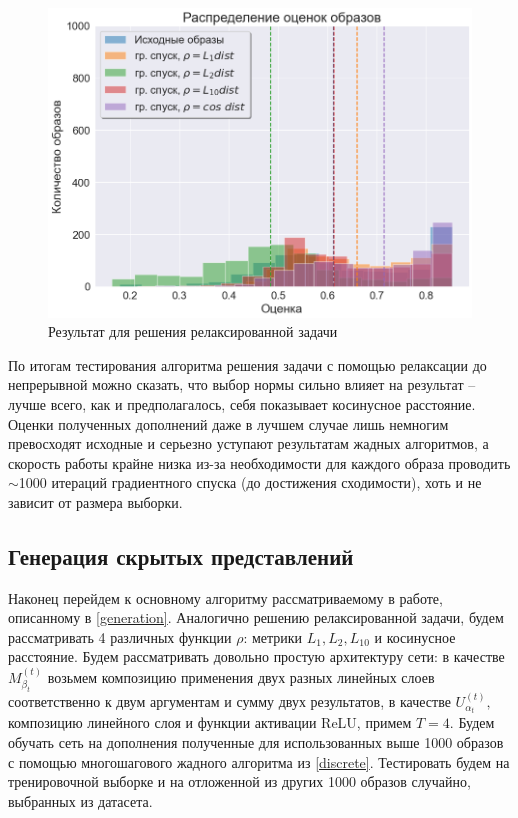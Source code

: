 \documentclass[a4paper,14pt]{extarticle}
\begin{document}
			\vspace{2cm}			
			\begin{figure}[h!]
				\centering
				\includegraphics[scale = 0.6]{../figures/backprop_at_least_5_subset1000.png}
				\caption{Результат для решения релаксированной задачи}
			\end{figure}
			\vspace{0.2cm}		
			По итогам тестирования алгоритма решения задачи с помощью релаксации до непрерывной можно сказать, что выбор нормы сильно влияет на результат -- лучше всего, как и предполагалось, себя показывает косинусное расстояние. Оценки полученных дополнений даже в лучшем случае лишь немногим превосходят исходные и серьезно уступают результатам жадных алгоритмов, а скорость работы крайне низка из-за необходимости для каждого образа проводить $\sim$1000 итераций градиентного спуска (до достижения сходимости), хоть и не зависит от размера выборки.
			
			\subsection{Генерация скрытых представлений}
				Наконец перейдем к основному алгоритму рассматриваемому в работе, описанному в \ref{generation}. Аналогично решению релаксированной задачи, будем рассматривать 4 различных функции $\rho$: метрики $L_1, L_2, L_{10}$ и косинусное расстояние. Будем рассматривать довольно простую архитектуру сети: в качестве $M^{(t)}_{\beta_t}$ возьмем композицию применения двух разных линейных слоев соответственно к двум аргументам и сумму двух результатов, в качестве $U^{(t)}_{\alpha_t},$ композицию линейного слоя и функции активации ReLU, примем $T=4$. Будем обучать сеть на дополнения полученные для использованных выше 1000 образов с помощью многошагового жадного алгоритма из \ref{discrete}. Тестировать будем на тренировочной выборке и на отложенной из других 1000 образов случайно, выбранных из датасета.
				
\end{document}
